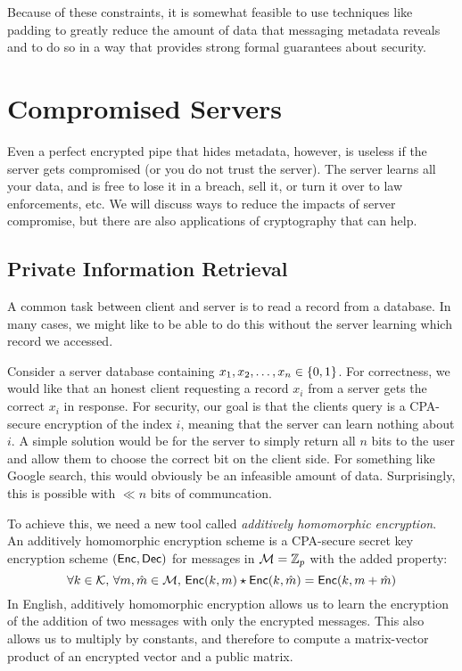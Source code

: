 Because of these constraints, it is somewhat feasible to use techniques like padding to greatly reduce the amount of data that messaging metadata reveals and to do so in a way that provides strong formal guarantees about security.

\section{Compromised Servers}
Even a perfect encrypted pipe that hides metadata, however, is useless if the server gets compromised (or you do not trust the server). The server learns all your data, and is free to lose it in a breach, sell it, or turn it over to law enforcements, etc. We will discuss ways to reduce the impacts of server compromise, but there are also applications of cryptography that can help.

\subsection{Private Information Retrieval}
A common task between client and server is to read a record from a database. In many cases, we might like to be able to do this without the server learning which record we accessed.

Consider a server database containing $x_1, x_2, \ldots, x_n \in \{0,1\}$. For correctness, we would like that an honest client requesting a record $x_i$ from a server gets the correct $x_i$ in response. For security, our goal is that the clients query is a CPA-secure encryption of the index $i$, meaning that the server can learn nothing about $i$. A simple solution would be for the server to simply return all $n$ bits to the user and allow them to choose the correct bit on the client side. For something like Google search, this would obviously be an infeasible amount of data. Surprisingly, this is possible with $\ll n$ bits of communcation.

To achieve this, we need a new tool called \emph{additively homomorphic encryption}. An additively homomorphic encryption scheme is a CPA-secure secret key encryption scheme $(\mathsf{Enc}, \mathsf{Dec})$ for messages in $\mathcal{M} = \mathbb{Z}_p$ with the added property:
\[ \forall k \in \mathcal{K},\, \forall m, \hat{m} \in \mathcal{M},\, \mathsf{Enc}(k, m) \star \mathsf{Enc}(k, \hat{m}) = \mathsf{Enc}(k, m + \hat{m}) \]
In English, additively homomorphic encryption allows us to learn the encryption of the addition of two messages with only the encrypted messages. This also allows us to multiply by constants, and therefore to compute a matrix-vector product of an encrypted vector and a public matrix.

